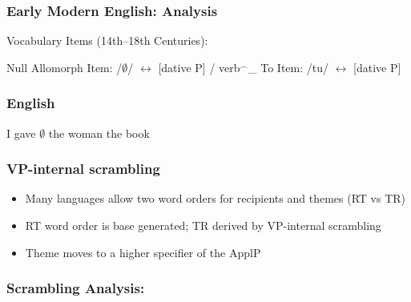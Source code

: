 \documentclass{beamer}
\begin{document}
\begin{frame}
	\frametitle{Early Modern English: Analysis}
	\begin{exe}
		\ex Vocabulary Items (14th--18th Centuries):
		\begin{xlist}
			\ex Null Allomorph Item: /$\emptyset$/ $\leftrightarrow$ [dative P] / verb$^{\smallfrown}$\_
			\ex To Item: /tu/ $\leftrightarrow$ [dative P]
		\end{xlist}
	\end{exe}
\end{frame}


\begin{frame}
	\frametitle{English}
	\vfill
	I gave $\emptyset$ the woman the book
	\vfill
\end{frame}

\begin{frame}
	\frametitle{VP-internal scrambling}
	\begin{itemize}
		\item Many languages allow two word orders for recipients and themes (RT vs TR)
		\item RT word order is base generated; TR derived by VP-internal scrambling \citep{Takano.1998,Lenerz.1977}
		\item Theme moves to a higher specifier of the ApplP \citep{McGinnis.1998}
	\end{itemize}
\end{frame}

\begin{frame}
	\frametitle{Scrambling Analysis:}
	\begin{exe}
		\ex
{}
	\end{exe}
\end{frame}
\end{document}

